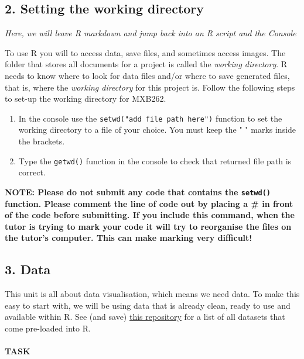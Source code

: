 \documentclass[]{article}
\providecommand{\tightlist}{%
  \setlength{\itemsep}{0pt}\setlength{\parskip}{0pt}}
\let\oldparagraph\paragraph
\renewcommand{\paragraph}[1]{\oldparagraph{#1}\mbox{}}
\begin{document}
\hypertarget{setting-the-working-directory}{%
\subsection{2. Setting the working
directory}\label{setting-the-working-directory}}

\emph{Here, we will leave R markdown and jump back into an R script and
the Console}

To use R you will to access data, save files, and sometimes access
images. The folder that stores all documents for a project is called the
\emph{working directory}. R needs to know where to look for data files
and/or where to save generated files, that is, where the \emph{working
directory} for this project is. Follow the following steps to set-up the
working directory for MXB262.

\begin{enumerate}
\def\labelenumi{\arabic{enumi}.}
\tightlist
\item
  In the console use the \texttt{setwd("add\ file\ path\ here")}
  function to set the working directory to a file of your choice. You
  must keep the " " marks inside the brackets.
\item
  Type the \texttt{getwd()} function in the console to check that
  returned file path is correct.
\end{enumerate}

\textbf{NOTE: Please do not submit any code that contains the
\texttt{setwd()} function. Please comment the line of code out by
placing a \# in front of the code before submitting. If you include this
command, when the tutor is trying to mark your code it will try to
reorganise the files on the tutor's computer. This can make marking very
difficult!}

\hypertarget{data}{%
\subsection{3. Data}\label{data}}

This unit is all about data visualisation, which means we need data. To
make this easy to start with, we will be using data that is already
clean, ready to use and available within R. See (and save)
\href{https://stat.ethz.ch/R-manual/R-devel/library/datasets/html/00Index.html}{this
repository} for a list of all datasets that come pre-loaded into R.

\hypertarget{task-2}{%
\paragraph{TASK}\label{task-2}}
\end{document}
